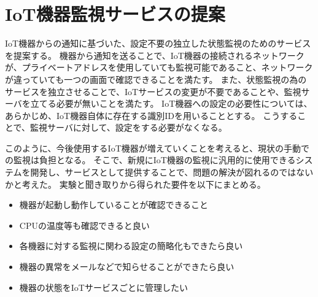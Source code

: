 \section{IoT機器監視サービスの提案}
IoT機器からの通知に基づいた、設定不要の独立した状態監視のためのサービスを提案する。
機器から通知を送ることで、IoT機器の接続されるネットワークが、プライベートアドレスを使用していても監視可能であること、ネットワークが違っていても一つの画面で確認できることを満たす。
また、状態監視の為のサービスを独立させることで、IoTサービスの変更が不要であることや、監視サーバを立てる必要が無いことを満たす。
IoT機器への設定の必要性については、あらかじめ、IoT機器自体に存在する識別IDを用いることとする。
こうすることで、監視サーバに対して、設定をする必要がなくなる。



このように、今後使用するIoT機器が増えていくことを考えると、現状の手動での監視は負担となる。
そこで、新規にIoT機器の監視に汎用的に使用できるシステムを開発し、サービスとして提供することで、問題の解決が図れるのではないかと考えた。
実験と聞き取りから得られた要件を以下にまとめる。
\begin{itemize}
\item 機器が起動し動作していることが確認できること
\item CPUの温度等も確認できると良い
\item 各機器に対する監視に関わる設定の簡略化もできたら良い
\item 機器の異常をメールなどで知らせることができたら良い
\item 機器の状態をIoTサービスごとに管理したい
\end{itemize}


\begin{comment}
\section{IoT機器監視サービスの機能}
前項の要件から、最低限必要となる機能を次にまとめた。
\begin{itemize}
\item ログイン・ログアウト機能
\item 機器状態の蓄積機能
\item 機器状態の可視化機能？
\end{itemize}
また、制約を次にまとめる。
\begin{itemize}
\item 機器がプライベートアドレスを利用していても監視することができること
\item 新たにIoTサービスを展開する際に、サーバを立ち上げる必要が無いこと
\end{itemize}
\end{comment}




